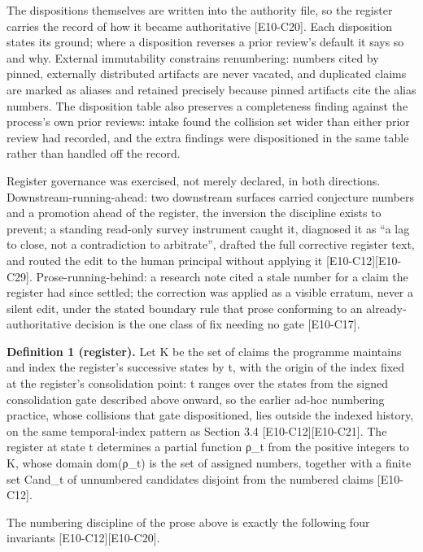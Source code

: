 \documentclass[
  11pt,
]{article}
\begin{document}
The dispositions themselves are written into the authority file, so the
register carries the record of how it became authoritative
{[}E10-C20{]}. Each disposition states its ground; where a disposition
reverses a prior review's default it says so and why. External
immutability constrains renumbering: numbers cited by pinned, externally
distributed artifacts are never vacated, and duplicated claims are
marked as aliases and retained precisely because pinned artifacts cite
the alias numbers. The disposition table also preserves a completeness
finding against the process's own prior reviews: intake found the
collision set wider than either prior review had recorded, and the extra
findings were dispositioned in the same table rather than handled off
the record.

Register governance was exercised, not merely declared, in both
directions. Downstream-running-ahead: two downstream surfaces carried
conjecture numbers and a promotion ahead of the register, the inversion
the discipline exists to prevent; a standing read-only survey instrument
caught it, diagnosed it as ``a lag to close, not a contradiction to
arbitrate'', drafted the full corrective register text, and routed the
edit to the human principal without applying it
{[}E10-C12{]}{[}E10-C29{]}. Prose-running-behind: a research note cited
a stale number for a claim the register had since settled; the
correction was applied as a visible erratum, never a silent edit, under
the stated boundary rule that prose conforming to an
already-authoritative decision is the one class of fix needing no gate
{[}E10-C17{]}.

\textbf{Definition 1 (register).} Let K be the set of claims the
programme maintains and index the register's successive states by t,
with the origin of the index fixed at the register's consolidation
point: t ranges over the states from the signed consolidation gate
described above onward, so the earlier ad-hoc numbering practice, whose
collisions that gate dispositioned, lies outside the indexed history, on
the same temporal-index pattern as Section 3.4
{[}E10-C12{]}{[}E10-C21{]}. The register at state t determines a partial
function ρ\_t from the positive integers to K, whose domain dom(ρ\_t) is
the set of assigned numbers, together with a finite set Cand\_t of
unnumbered candidates disjoint from the numbered claims {[}E10-C12{]}.

The numbering discipline of the prose above is exactly the following
four invariants {[}E10-C12{]}{[}E10-C20{]}.
\end{document}

